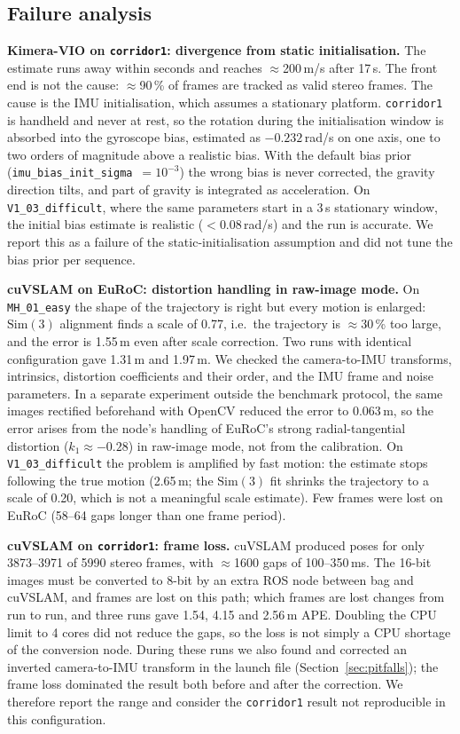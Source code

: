 \documentclass[conference,a4paper]{IEEEtran}
\newcommand{\ds}[1]{\texttt{#1}}
\newcommand{\MHe}{\ds{MH\_01\_easy}}
\newcommand{\VId}{\ds{V1\_03\_difficult}}
\newcommand{\corr}{\ds{corridor1}}
\newcommand{\Sim}{$\mathrm{Sim}(3)$}
\begin{document}
\subsection{Failure analysis}
\label{sec:failures}

\textbf{Kimera-VIO on \corr{}: divergence from static initialisation.} The estimate runs away
within seconds and reaches $\approx$200\,m/s after 17\,s. The front end is not the cause:
$\approx$90\,\% of frames are tracked as valid stereo frames. The cause is the IMU
initialisation, which assumes a stationary platform. \corr{} is handheld and never at rest, so
the rotation during the initialisation window is absorbed into the gyroscope bias, estimated as
$-0.232$\,rad/s on one axis, one to two orders of magnitude above a realistic bias. With the
default bias prior (\texttt{imu\_bias\_init\_sigma}~$=10^{-3}$) the wrong bias is never
corrected, the gravity direction tilts, and part of gravity is integrated as acceleration. On
\VId{}, where the same parameters start in a 3\,s stationary window, the initial bias estimate is
realistic ($<$0.08\,rad/s) and the run is accurate. We report this as a failure of the
static-initialisation assumption and did not tune the bias prior per sequence.

\textbf{cuVSLAM on EuRoC: distortion handling in raw-image mode.}
\label{sec:cuvslam}
On \MHe{} the shape of the trajectory is right but every motion is enlarged: \Sim{} alignment
finds a scale of 0.77, i.e.\ the trajectory is $\approx$30\,\% too large, and the error is
1.55\,m even after scale correction. Two runs with identical configuration gave 1.31\,m and
1.97\,m. We checked the camera-to-IMU transforms, intrinsics, distortion coefficients and their
order, and the IMU frame and noise parameters. In a separate experiment outside the benchmark
protocol, the same images rectified beforehand with OpenCV reduced the error to 0.063\,m, so the
error arises from the node's handling of EuRoC's strong radial-tangential distortion
($k_1 \approx -0.28$) in raw-image mode, not from the calibration. On \VId{} the problem is
amplified by fast motion: the estimate stops following the true motion (2.65\,m; the \Sim{} fit
shrinks the trajectory to a scale of 0.20, which is not a meaningful scale estimate). Few frames
were lost on EuRoC (58--64 gaps longer than one frame period).

\textbf{cuVSLAM on \corr{}: frame loss.} cuVSLAM produced poses for only 3873--3971 of 5990
stereo frames, with $\approx$1600 gaps of 100--350\,ms. The 16-bit images must be converted to
8-bit by an extra ROS node between bag and cuVSLAM, and frames are lost on this path; which
frames are lost changes from run to run, and three runs gave 1.54, 4.15 and 2.56\,m APE. Doubling
the CPU limit to 4 cores did not reduce the gaps, so the loss is not simply a CPU shortage of the
conversion node. During these runs we also found and corrected an inverted camera-to-IMU
transform in the launch file (Section~\ref{sec:pitfalls}); the frame loss dominated the result
both before and after the correction. We therefore report the range and consider the
\corr{} result not reproducible in this configuration.
\end{document}
